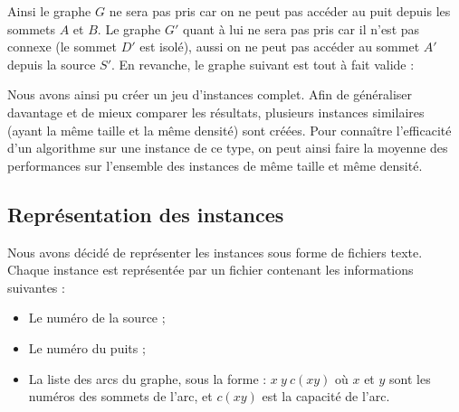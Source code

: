 \documentclass[a4paper]{article}
\begin{document}
Ainsi le graphe $G$ ne sera pas pris car on ne peut pas accéder au puit depuis les sommets $A$ et $B$. Le graphe $G'$ quant à lui ne sera pas pris car il n'est pas connexe (le sommet $D'$ est isolé), aussi on ne peut pas accéder au sommet $A'$ depuis la source $S'$. En revanche, le graphe suivant est tout à fait valide :

\begin{center}
\end{center}
Nous avons ainsi pu créer un jeu d’instances complet. Afin de généraliser davantage et de mieux comparer les résultats, plusieurs instances similaires (ayant la même taille et la même densité) sont créées. Pour connaître l’efficacité d’un algorithme sur une instance de ce type, on peut ainsi faire la moyenne des performances sur l’ensemble des instances de même taille et même densité.
\subsection{Représentation des instances}
Nous avons décidé de représenter les instances sous forme de fichiers texte. Chaque instance est représentée par un fichier contenant les informations suivantes :
\begin{itemize}
	\item Le numéro de la source ;
	\item Le numéro du puits ;
	\item La liste des arcs du graphe, sous la forme : $x\ y\ c(xy)$ où $x$ et $y$ sont les numéros des sommets de l’arc, et $c(xy)$ est la capacité de l’arc.
\end{itemize}
\end{document}
